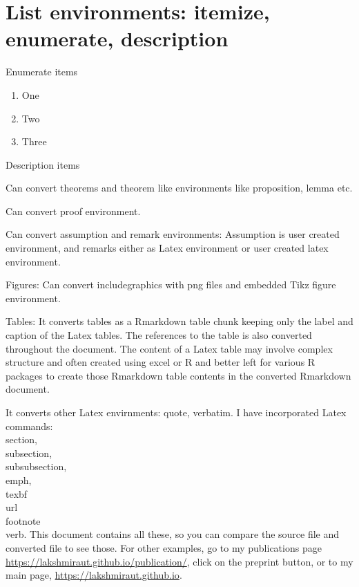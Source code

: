 \documentclass[12pt,svgnames]{article}
\begin{document}

\section{List environments: itemize, enumerate, description}\label{sec6}

Enumerate items

\begin{enumerate}
\item One
\item Two
\item Three
\end{enumerate}

Description items

\begin{description} 
  \item Can convert theorems and theorem like environments like proposition, lemma etc.

  \item Can convert proof environment. 
  
  \item Can convert assumption and remark environments: Assumption is user created environment, and remarks either as Latex environment or user created latex environment.
   
  \item Figures: Can convert includegraphics with png files and embedded Tikz figure environment. 
  
  \item Tables: It converts tables as a Rmarkdown table chunk keeping only the label and caption of the Latex tables. The references to the table is also converted throughout the document.  The content of a Latex table may involve complex structure and often created using excel or R and better left for various R packages to create those Rmarkdown table contents in the converted Rmarkdown document.
  
  \item It converts other Latex envirnments: quote, verbatim. I have incorporated Latex commands:  \\section, \\subsection, \\subsubsection,  \\emph, \\texbf \\url \\footnote \\verb.  This document contains all these, so you can compare the source file and converted file to see those.  For other examples, go to my publications page \url{https://lakshmiraut.github.io/publication/}, click on the preprint button, or to my main page, \url{https://lakshmiraut.github.io}.
  
\end{description} 
\end{document}

